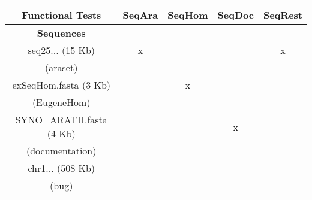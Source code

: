 \documentclass[a4paper,11pt]{article}
\begin{document}
\begin{center}
\begin{tabular}{|c|c|c|c|c|} \hline \hline
{\bf Functional Tests}& {\bf SeqAra}& {\bf SeqHom}& {\bf SeqDoc}& {\bf SeqRest}\\ \hline \hline

{\bf Sequences}& & & & \\ \hline \hline
seq25... (15 Kb)            & x &   &   & x   \\
(araset)                 &   &   &   &     \\ \hline 
exSeqHom.fasta (3 Kb)    &   & x &   &     \\ 
(EugeneHom)              &   &   &   &    \\ \hline 
SYNO\_ARATH.fasta (4 Kb) &   &   & x &     \\ 
(documentation)          &   &   &   &    \\ \hline 
chr1... (508 Kb)            &   &   &   &   \\ 
(bug)                    &   &   &   &    \\ \hline \hline 


\end{tabular}
\end{center}
\end{document}

